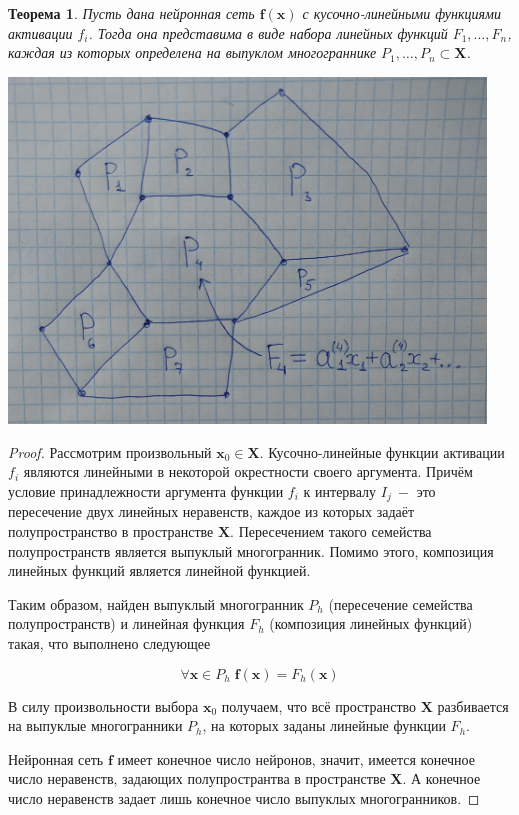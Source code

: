 \documentclass[a4paper, 12pt]{article}
\newtheorem{theorem}{Теорема}
\begin{document}
\begin{theorem}
Пусть дана нейронная сеть $\mathbf{f}(\mathbf{x})$ с кусочно-линейными функциями активации $f_i$. Тогда она представима в виде набора линейных функций $F_1,\dots,F_n$, каждая из которых определена на выпуклом многограннике $P_1,\dots,P_n \subset \mathbf{X}$.
\end{theorem}
\includegraphics[width=0.95\textwidth]{../figures/polys.jpg}
\begin{proof}
Рассмотрим произвольный $\mathbf{x}_0\in\mathbf{X}$. Кусочно-линейные функции активации $f_i$ являются линейными в некоторой окрестности своего аргумента. Причём условие принадлежности аргумента функции $f_i$ к интервалу $I_j~-$ это пересечение двух линейных неравенств, каждое из которых задаёт полупространство в пространстве $\mathbf{X}$. Пересечением такого семейства полупространств является выпуклый многогранник. Помимо этого, композиция линейных функций является линейной функцией.

Таким образом, найден выпуклый многогранник $P_h$ (пересечение семейства полупространств) и линейная функция $F_h$ (композиция линейных функций) такая, что выполнено следующее

$$\forall \mathbf{x}\in P_h\; \mathbf{f}(\mathbf{x})=F_h(\mathbf{x})$$

В силу произвольности выбора $\mathbf{x}_0$ получаем, что всё пространство $\mathbf{X}$ разбивается на выпуклые многогранники $P_h$, на которых заданы линейные функции $F_h$.

Нейронная сеть $\mathbf{f}$ имеет конечное число нейронов, значит, имеется конечное число неравенств, задающих полупространтва в пространстве $\mathbf{X}$. А конечное число неравенств задает лишь конечное число выпуклых многогранников. 
\end{proof}
\end{document}
